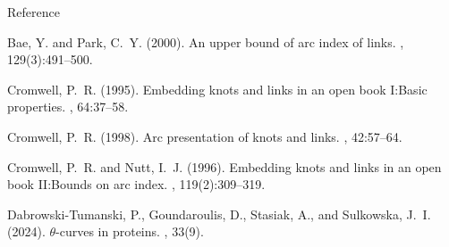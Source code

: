 \begin{frame}{Reference}

\begin{thebibliography}{}

Bae, Y. and Park, C.~Y. (2000).
\newblock An upper bound of arc index of links.
, 129(3):491--500.

Cromwell, P.~R. (1995).
\newblock Embedding knots and links in an open book {I}:{B}asic properties.
, 64:37--58.

Cromwell, P.~R. (1998).
\newblock Arc presentation of knots and links.
, 42:57--64.

Cromwell, P.~R. and Nutt, I.~J. (1996).
\newblock Embedding knots and links in an open book {II}:{B}ounds on arc index.
, 119(2):309--319.

Dabrowski-Tumanski, P., Goundaroulis, D., Stasiak, A., and Sulkowska, J.~I.
  (2024).
\newblock $\theta$-curves in proteins.
, 33(9).
\end{thebibliography}
\end{frame}

